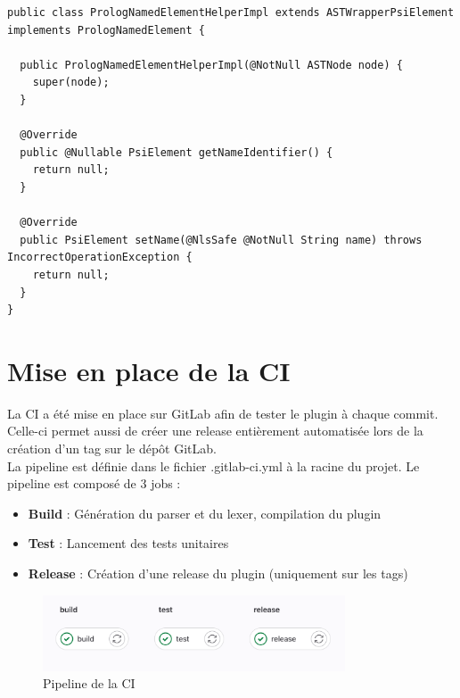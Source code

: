 \begin{lstlisting}
public class PrologNamedElementHelperImpl extends ASTWrapperPsiElement implements PrologNamedElement {

  public PrologNamedElementHelperImpl(@NotNull ASTNode node) {
    super(node);
  }

  @Override
  public @Nullable PsiElement getNameIdentifier() {
    return null;
  }

  @Override
  public PsiElement setName(@NlsSafe @NotNull String name) throws IncorrectOperationException {
    return null;
  }
}
\end{lstlisting}


\section{Mise en place de la CI}
\noindent La CI a été mise en place sur GitLab afin de tester le plugin à chaque commit.
Celle-ci permet aussi de créer une release entièrement automatisée lors de la création d'un tag sur le dépôt GitLab.
\\ \noindent La pipeline est définie dans le fichier .gitlab-ci.yml à la racine du projet.
\newdoubleline
\noindent Le pipeline est composé de 3 jobs :
\begin{itemize}
    \item \textbf{Build} : Génération du parser et du lexer, compilation du plugin
    \item \textbf{Test} : Lancement des tests unitaires
    \item \textbf{Release} : Création d'une release du plugin (uniquement sur les tags)
\end{itemize}

\begin{figure}[H]
    \centering
    \includegraphics[width=0.8\textwidth]{images/Pipeline.png}
    \caption{Pipeline de la CI}
    \label{fig:gitlab-ci}
\end{figure}
